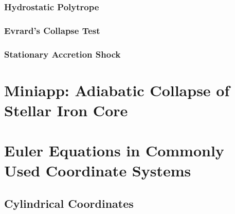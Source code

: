 \documentclass[10pt,preprint]{aastex}
\begin{document}
\subsubsection{Hydrostatic Polytrope}

\subsubsection{Evrard's Collapse Test}

\subsubsection{Stationary Accretion Shock}

\section{Miniapp: Adiabatic Collapse of Stellar Iron Core}




\appendix

\section{Euler Equations in Commonly Used Coordinate Systems}
\label{app:CurvilinearEuler}

\subsection{Cylindrical Coordinates}
\end{document}
